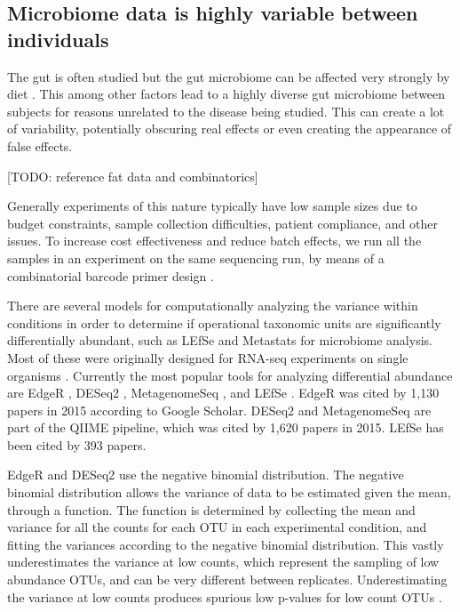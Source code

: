 \subsection{Microbiome data is highly variable between individuals}
The gut is often studied but the gut microbiome can be affected very strongly by diet \cite{turnbaugh2009effect}. This among other factors lead to a highly diverse gut microbiome between subjects for reasons unrelated to the disease being studied. This can create a lot of variability, potentially obscuring real effects or even creating the appearance of false effects.

[TODO: reference fat data and combinatorics]

Generally experiments of this nature typically have low sample sizes due to budget constraints, sample collection difficulties, patient compliance, and other issues. To increase cost effectiveness and reduce batch effects, we run all the samples in an experiment on the same sequencing run, by means of a combinatorial barcode primer design \cite{gloor2010microbiome}.

There are several models for computationally analyzing the variance within conditions in order to determine if operational taxonomic units are significantly differentially abundant, such as LEfSe \cite{segata2011metagenomic} and Metastats \cite{paulson2011metastats} for microbiome analysis. Most of these were originally designed for RNA-seq experiments on single organisms \cite{pachter2011models}. Currently the most popular tools for analyzing differential abundance are EdgeR \cite{robinson2010edger}, DESeq2 \cite{love2014moderated}, MetagenomeSeq \cite{paulson2014metagenomeseq}, and LEfSe \cite{segata2011metagenomic}. EdgeR was cited by 1,130 papers in 2015 according to Google Scholar. DESeq2 and MetagenomeSeq are part of the QIIME pipeline, which was cited by 1,620 papers in 2015. LEfSe has been cited by 393 papers.

EdgeR and DESeq2 use the negative binomial distribution. The negative binomial distribution allows the variance of data to be estimated given the mean, through a function. The function is determined by collecting the mean and variance for all the counts for each OTU in each experimental condition, and fitting the variances according to the negative binomial distribution. This vastly underestimates the variance at low counts, which represent the sampling of low abundance OTUs, and can be very different between replicates. Underestimating the variance at low counts produces spurious low p-values for low count OTUs \cite{fernandes2013anova}.

